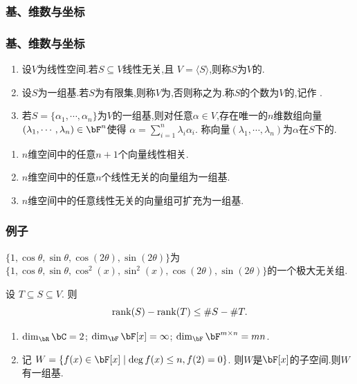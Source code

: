 \subsubsection{基、维数与坐标}
\begin{frame}\frametitle{基、维数与坐标}
\begin{definition}
\begin{enumerate}
\item 设$V$为线性空间.\pp 若$S\subseteq V$线性无关,且 $V=\langle S\rangle$,\pp 则称$S$为$V$的. \pp
\item 设$S$为一组基.\pp 若$S$为有限集,则称$V$为,\pp 否则称之为.\pp 称$S$的个数为$V$的,\pp 记作 .\pp
\item 若$S=\{\alpha_1,\cdots,\alpha_n\}$为$V$的一组基,则对任意$\alpha\in V$,存在唯一的$n$维数组向量 $(\lambda_1,\cdots,\lambda_n)\in \bF^n$使得
$\alpha = \sum\limits_{i=1}^n \lambda_i\alpha_i.$ \pp
称向量$(\lambda_1,\cdots,\lambda_n)$为$\alpha$在$S$下的.
\end{enumerate}
\end{definition}
\pp
\begin{theorem}
\begin{enumerate}
\item $n$维空间中的任意$n+1$个向量线性相关. \pp
\item $n$维空间中的任意$n$个线性无关的向量组为一组基.\pp
\item $n$维空间中的任意线性无关的向量组可扩充为一组基.
\end{enumerate}
\end{theorem}
\end{frame}






\begin{frame}\frametitle{例子}
\begin{example}
$\{1,\cos\theta,\sin\theta,\cos(2\theta),\sin(2\theta)\}$为$\{1,\cos\theta,\sin\theta,\cos^2(x),\sin^2(x),\cos(2\theta),\sin(2\theta)\}$的一个极大无关组.
\end{example}
\pp
\begin{example}
设 $T\subseteq S\subseteq V$. 则
\[\operatorname{rank}(S)-\operatorname{rank}(T) \leq \#S- \#T.\]
\end{example}
\pp
{}

\pp
\begin{example}
\begin{enumerate}
\item $\dim_\bR \bC = 2$; \pp $\dim_\bF \bF[x] = \infty$; \pp $\dim_\bF \bF^{m\times n}=mn$. \pp
\item 记 $W=\{f(x)\in\bF[x]\mid\deg f(x)\leq n,f(2)=0\}$. 则$W$是$\bF[x]$的子空间.则$W$有一组基\underline{\qquad\qquad\qquad}.
\end{enumerate}
\end{example}
\end{frame}





